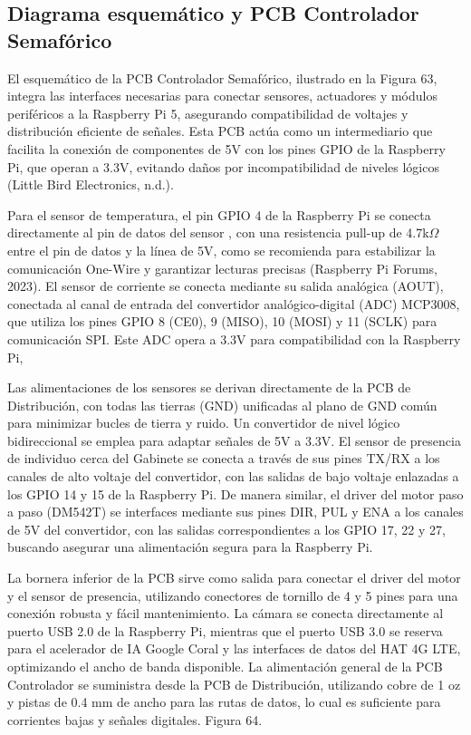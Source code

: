 \documentclass[12pt,a4paper,oneside]{report}
\begin{document}
\subsection{Diagrama esquemático y PCB Controlador Semafórico}\label{diagrama-esquemuxe1tico-y-pcb-controlador-semafuxf3rico}

El esquemático de la PCB Controlador Semafórico, ilustrado en la Figura 63, integra las interfaces necesarias para conectar sensores, actuadores y módulos periféricos a la Raspberry Pi 5, asegurando compatibilidad de voltajes y distribución eficiente de señales. Esta PCB actúa como un intermediario que facilita la conexión de componentes de 5V con los pines GPIO de la Raspberry Pi, que operan a 3.3V, evitando daños por incompatibilidad de niveles lógicos (Little Bird Electronics, n.d.).

Para el sensor de temperatura, el pin GPIO 4 de la Raspberry Pi se conecta directamente al pin de datos del sensor , con una resistencia pull-up de 4.7k\ensuremath{\Omega} entre el pin de datos y la línea de 5V, como se recomienda para estabilizar la comunicación One-Wire y garantizar lecturas precisas (Raspberry Pi Forums, 2023). El sensor de corriente se conecta mediante su salida analógica (AOUT), conectada al canal de entrada del convertidor analógico-digital (ADC) MCP3008, que utiliza los pines GPIO 8 (CE0), 9 (MISO), 10 (MOSI) y 11 (SCLK) para comunicación SPI. Este ADC opera a 3.3V para compatibilidad con la Raspberry Pi,

Las alimentaciones de los sensores se derivan directamente de la PCB de Distribución, con todas las tierras (GND) unificadas al plano de GND común para minimizar bucles de tierra y ruido. Un convertidor de nivel lógico bidireccional se emplea para adaptar señales de 5V a 3.3V. El sensor de presencia de individuo cerca del Gabinete se conecta a través de sus pines TX/RX a los canales de alto voltaje del convertidor, con las salidas de bajo voltaje enlazadas a los GPIO 14 y 15 de la Raspberry Pi. De manera similar, el driver del motor paso a paso (DM542T) se interfaces mediante sus pines DIR, PUL y ENA a los canales de 5V del convertidor, con las salidas correspondientes a los GPIO 17, 22 y 27, buscando asegurar una alimentación segura para la Raspberry Pi.

La bornera inferior de la PCB sirve como salida para conectar el driver del motor y el sensor de presencia, utilizando conectores de tornillo de 4 y 5 pines para una conexión robusta y fácil mantenimiento. La cámara se conecta directamente al puerto USB 2.0 de la Raspberry Pi, mientras que el puerto USB 3.0 se reserva para el acelerador de IA Google Coral y las interfaces de datos del HAT 4G LTE, optimizando el ancho de banda disponible. La alimentación general de la PCB Controlador se suministra desde la PCB de Distribución, utilizando cobre de 1 oz y pistas de 0.4 mm de ancho para las rutas de datos, lo cual es suficiente para corrientes bajas y señales digitales. Figura 64.
\end{document}

